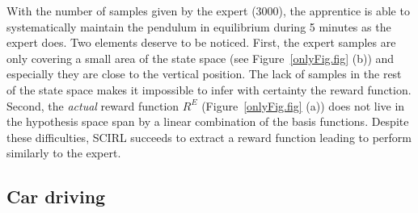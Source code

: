 \documentclass[tablecaption=bottom]{jmlr}
\begin{document}
With the number of samples given by the expert (3000), the
apprentice is able to systematically maintain the pendulum in
equilibrium during 5 minutes as the expert does.
%
%
Two elements deserve to be noticed. First, the expert samples are
only covering a small area of the state space (see
Figure~\ref{onlyFig.fig} (b)) and especially they are close to the
vertical position. The lack of samples in the rest of the state
space makes it impossible to infer with certainty the reward
function. Second, the \textit{actual} reward function $R^E$
(Figure~\ref{onlyFig.fig} (a)) does not live in the hypothesis space
span by a linear combination of the basis functions. Despite these
difficulties, SCIRL succeeds to extract a reward function leading to
perform similarly to the expert. %

\subsection{Car driving}
\end{document}
